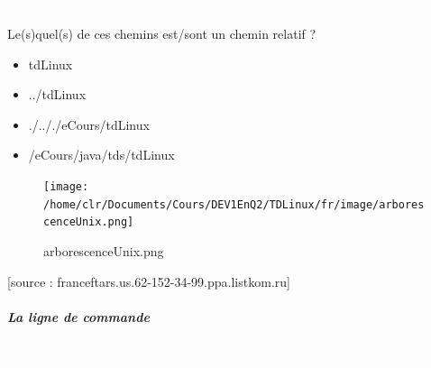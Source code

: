 \documentclass[11pt,a4paper]{article}
\begin{document}
			
		\subparagraph{} 
		
                \textcolor{white}{.} \par
            Le(s)quel(s) de ces chemins est/sont un chemin relatif ?
						
            \begin{itemize} 
        
            \item[ \ding{"6F} ] tdLinux
        
            \item[ \ding{"6F} ] ../tdLinux
        
            \item[ \ding{"6F} ] ./.././eCours/tdLinux
        
            \item[ \ding{"6F} ] /eCours/java/tds/tdLinux
        
            \end{itemize} 
        \begin{figure}[hbt]
				    \begin{center}
					\texttt{[image: /home/clr/Documents/Cours/DEV1EnQ2/TDLinux/fr/image/arborescenceUnix.png]}
						\end{center}
                
                    \caption[arborescenceUnix.png]{arborescenceUnix.png}
                \end{figure}
                    
			    
			    [source : franceftars.us.62-152-34-99.ppa.listkom.ru]
        
            \par
        
			
		\subparagraph{La ligne de commande} 
		
                \textcolor{white}{.} \par
            
\end{document}
